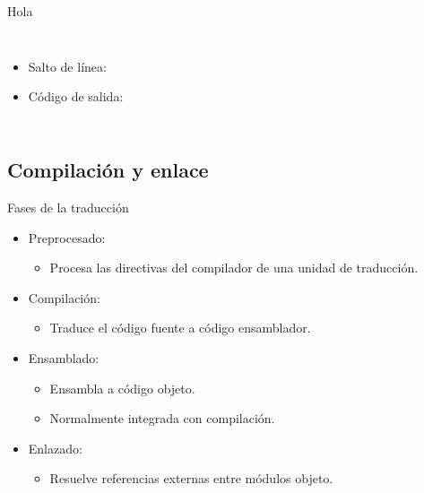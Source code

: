 \begin{frame}{Hola}
\begin{columns}
\begin{itemize}
{        \begin{itemize}
          \item Operador para enviar datos a la salida estándar.
          \item Definido para la mayoría de los tipos.
        \end{itemize}
      }
    \item Salto de línea: 
    \item Código de salida: 
  \end{itemize}

\end{columns}
\end{frame}

\subsection{Compilación y enlace}

\begin{frame}[t]{Fases de la traducción}
\begin{itemize}
  \item Preprocesado:
    \begin{itemize}
      \item Procesa las directivas del compilador de una unidad de traducción.
    \end{itemize}
  \vfill
  \item Compilación:
    \begin{itemize}
      \item Traduce el código fuente a código ensamblador.
    \end{itemize}
  \vfill
  \item Ensamblado:
    \begin{itemize}
      \item Ensambla a código objeto.
      \item Normalmente integrada con compilación.
    \end{itemize}
  \vfill
  \item Enlazado:
    \begin{itemize}
      \item Resuelve referencias externas entre módulos objeto.
    \end{itemize}
\end{itemize}
\end{frame}

